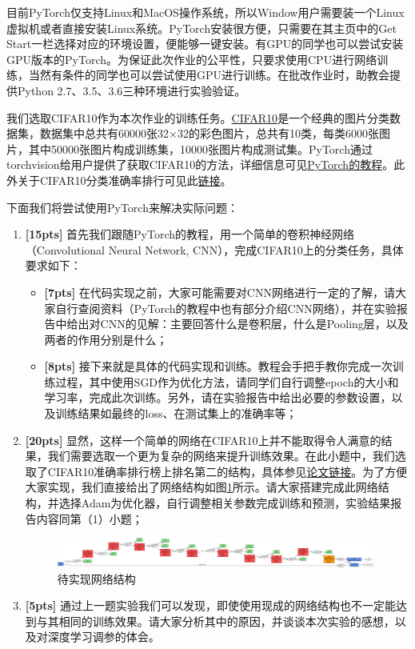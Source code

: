 \documentclass[a4paper,UTF8]{article}
\numberwithin{equation}{section}
\begin{document}
目前PyTorch仅支持Linux和MacOS操作系统，所以Window用户需要装一个Linux虚拟机或者直接安装Linux系统。PyTorch安装很方便，只需要在其主页中的Get Start一栏选择对应的环境设置，便能够一键安装。有GPU的同学也可以尝试安装GPU版本的PyTorch。为保证此次作业的公平性，只要求使用CPU进行网络训练，当然有条件的同学也可以尝试使用GPU进行训练。在批改作业时，助教会提供Python 2.7、3.5、3.6三种环境进行实验验证。

我们选取CIFAR10作为本次作业的训练任务。\href{https://en.wikipedia.org/wiki/CIFAR-10}{CIFAR10}是一个经典的图片分类数据集，数据集中总共有60000张32$\times$32的彩色图片，总共有10类，每类6000张图片，其中50000张图片构成训练集，10000张图片构成测试集。PyTorch通过torchvision给用户提供了获取CIFAR10的方法，详细信息可见\href{http://pytorch.org/tutorials/beginner/blitz/cifar10_tutorial.html}{PyTorch的教程}。此外关于CIFAR10分类准确率排行可见此\href{http://rodrigob.github.io/are_we_there_yet/build/classification_datasets_results.html}{链接}。

下面我们将尝试使用PyTorch来解决实际问题：

\begin{enumerate}[(1)]
	\item \textbf{[15pts]} 首先我们跟随PyTorch的教程，用一个简单的卷积神经网络（Convolutional Neural Network, CNN），完成CIFAR10上的分类任务，具体要求如下：
	
	\begin{itemize}
		\item \textbf{[7pts]} 在代码实现之前，大家可能需要对CNN网络进行一定的了解，请大家自行查阅资料（PyTorch的教程中也有部分介绍CNN网络），并在实验报告中给出对CNN的见解：主要回答什么是卷积层，什么是Pooling层，以及两者的作用分别是什么；
		\item \textbf{[8pts]} 接下来就是具体的代码实现和训练。教程会手把手教你完成一次训练过程，其中使用SGD作为优化方法，请同学们自行调整epoch的大小和学习率，完成此次训练。另外，请在实验报告中给出必要的参数设置，以及训练结果如最终的loss、在测试集上的准确率等；
	\end{itemize}
	\item \textbf{[20pts]} 显然，这样一个简单的网络在CIFAR10上并不能取得令人满意的结果，我们需要选取一个更为复杂的网络来提升训练效果。在此小题中，我们选取了CIFAR10准确率排行榜上排名第二的结构，具体参见\href{https://arxiv.org/pdf/1412.6806.pdf}{论文链接}。为了方便大家实现，我们直接给出了网络结构如图\ref{network_structure}所示。请大家搭建完成此网络结构，并选择Adam为优化器，自行调整相关参数完成训练和预测，实验结果报告内容同第（1）小题；
	\begin{figure}[!h]
		\centering   
		\includegraphics[width=0.99\textwidth,height=0.15\textwidth]{nn_structure.png}  
		\caption{待实现网络结构} 
		\label{network_structure}
	\end{figure}
	\item \textbf{[5pts]} 通过上一题实验我们可以发现，即使使用现成的网络结构也不一定能达到与其相同的训练效果。请大家分析其中的原因，并谈谈本次实验的感想，以及对深度学习调参的体会。
\end{enumerate}
\end{document}

